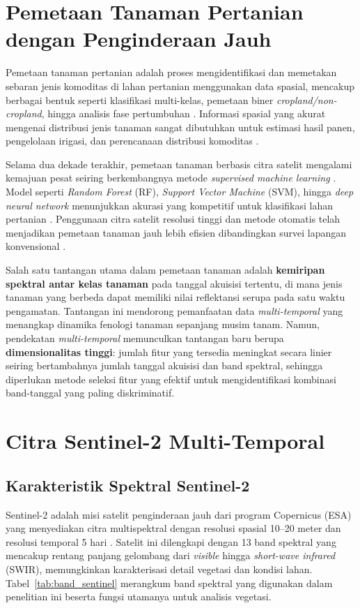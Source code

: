 \section{Pemetaan Tanaman Pertanian dengan Penginderaan Jauh}
Pemetaan tanaman pertanian adalah proses mengidentifikasi dan memetakan sebaran jenis komoditas di lahan pertanian menggunakan data spasial, mencakup berbagai bentuk seperti klasifikasi multi-kelas, pemetaan biner \textit{cropland/non-cropland}, hingga analisis fase pertumbuhan \cite{alamimachichi2023}.
Informasi spasial yang akurat mengenai distribusi jenis tanaman sangat dibutuhkan untuk estimasi hasil panen, pengelolaan irigasi, dan perencanaan distribusi komoditas \cite{gao2023}.

Selama dua dekade terakhir, pemetaan tanaman berbasis citra satelit mengalami kemajuan pesat seiring berkembangnya metode \textit{supervised machine learning} \cite{weiss2020}.
Model seperti \textit{Random Forest} (RF), \textit{Support Vector Machine} (SVM), hingga \textit{deep neural network} menunjukkan akurasi yang kompetitif untuk klasifikasi lahan pertanian \cite{zhao2020}.
Penggunaan citra satelit resolusi tinggi dan metode otomatis telah menjadikan pemetaan tanaman jauh lebih efisien dibandingkan survei lapangan konvensional \cite{alamimachichi2023}.

Salah satu tantangan utama dalam pemetaan tanaman adalah \textbf{kemiripan spektral antar kelas tanaman} pada tanggal akuisisi tertentu, di mana jenis tanaman yang berbeda dapat memiliki nilai reflektansi serupa pada satu waktu pengamatan.
Tantangan ini mendorong pemanfaatan data \textit{multi-temporal} yang menangkap dinamika fenologi tanaman sepanjang musim tanam.
Namun, pendekatan \textit{multi-temporal} memunculkan tantangan baru berupa \textbf{dimensionalitas tinggi}: jumlah fitur yang tersedia meningkat secara linier seiring bertambahnya jumlah tanggal akuisisi dan band spektral, sehingga diperlukan metode seleksi fitur yang efektif untuk mengidentifikasi kombinasi band-tanggal yang paling diskriminatif.

\section{Citra Sentinel-2 Multi-Temporal}
\subsection{Karakteristik Spektral Sentinel-2}
Sentinel-2 adalah misi satelit penginderaan jauh dari program Copernicus (ESA) yang menyediakan citra multispektral dengan resolusi spasial 10--20 meter dan resolusi temporal 5 hari \cite{phiri2020}.
Satelit ini dilengkapi dengan 13 band spektral yang mencakup rentang panjang gelombang dari \textit{visible} hingga \textit{short-wave infrared} (SWIR), memungkinkan karakterisasi detail vegetasi dan kondisi lahan.
Tabel~\ref{tab:band_sentinel} merangkum band spektral yang digunakan dalam penelitian ini beserta fungsi utamanya untuk analisis vegetasi.


